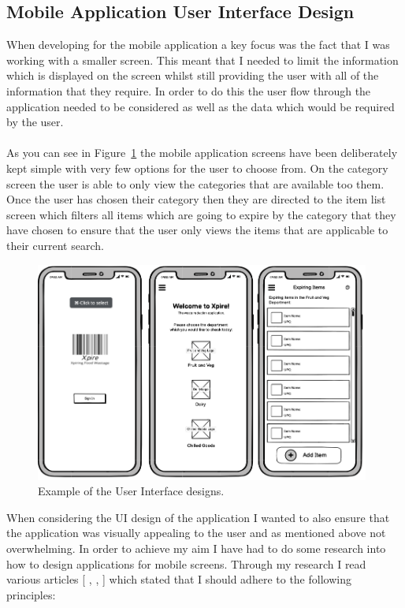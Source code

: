 \documentclass[a4paper,11pt]{report}
\begin{document}
\subsection{Mobile Application User Interface Design}

When developing for the mobile application a key focus was the fact that I was working with a smaller screen. This meant that I needed to limit the information which is displayed on the screen whilst still providing the user with all of the information that they require. In order to do this the user flow through the application needed to be considered as well as the data which would be required by the user.
\\
\\
As you can see in Figure~\ref{fig:UIDesignExample} the mobile application screens have been deliberately kept simple with very few options for the user to choose from. On the category screen the user is able to only view the categories that are available too them. Once the user has chosen their category then they are directed to the item list screen which filters all items which are going to expire by the category that they have chosen to ensure that the user only views the items that are applicable to their current search.

\begin{figure}[H]
    \centering
    \includegraphics[width=11cm]{./assets/images/uiDesign-example.png}
    \caption{Example of the User Interface designs.}
    \label{fig:UIDesignExample}
\end{figure}

When considering the UI design of the application I wanted to also ensure that the application was visually appealing to the user and as mentioned above not overwhelming. In order to achieve my aim I have had to do some research into how to design applications for mobile screens. Through my research I read various articles [ \cite{mobile-first}, \cite{design-mobile}, \cite{comprehensive-design}] which stated that I should adhere to the following principles:
\end{document}
